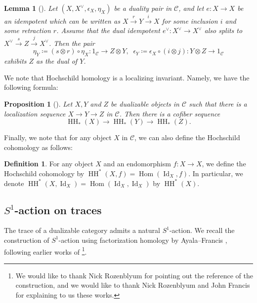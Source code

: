 \documentclass[11pt]{amsart}
\numberwithin{equation}{section}
\theoremstyle{plain}
\newtheorem{Prop}[prop]{Proposition}
\newtheorem{Lemma}[lemma]{Lemma}
\theoremstyle{definition}
\newtheorem{Def}[def]{Definition}
\theoremstyle{remark}
\newcommand{\cC} { {\mathcal{C}}}
\newcommand{\Id}{{\operatorname{Id}}}
\newcommand\HH{\operatorname{HH}}
\newcommand\Hom{\operatorname{Hom}}
\begin{document}
\begin{Lemma}[{\cite[Lemma~2.1]{Hochschild-Kuo-Shende-Zhang}}]\label{lemma: formula for dualizaing data}
Let $(X,X^\vee,\epsilon_X,\eta_X)$ be a duality pair in $\cC$, and
let $e: X \rightarrow X$ be an idempotent which can be written as $X \xrightarrow{r} Y \xrightarrow{i} X$
for some inclusion $i$ and some retraction $r$. 
Assume that the dual idempotent $e^\vee: X^\vee \rightarrow X^\vee$ also splits to $X^\vee \xrightarrow{s} Z \xrightarrow{j} X^\vee$. 
Then the pair
\[\eta_Y \coloneqq (s \otimes r) \circ \eta_X : 1_{\cC} \rightarrow Z \otimes Y, \;\; \epsilon_Y \coloneqq \epsilon_X \circ (i \otimes j) : Y \otimes Z \rightarrow 1_{\cC}\]
exhibits $Z$ as the dual of $Y$. 
\end{Lemma}

We note that Hochschild homology is a localizing invariant. Namely, we have the following formula:

\begin{Prop}[{\cite[Theorem 3.4]{Hoyois-Scherotzke-Sibilla}}]\label{prop:hochschild-fiber-seq}
Let $X, Y$ and $Z$ be dualizable objects in $\cC$ such that there is a localization sequence $X \to Y \to Z$ in $\cC$.
Then there is a cofiber sequence
\[\HH_*(X) \to \HH_*(Y) \to \HH_*(Z).\]
\end{Prop}

Finally, we note that for any object $X$ in $\cC$, we can also define the Hochschild cohomology as follows:

\begin{Def}
For any object $X$ and an endomorphism $f:X\to X$, we define the Hochschild cohomology by $\HH^*(X, f) = \Hom(\Id_X, f)$. In particular, we denote $\HH^*(X, \Id_X) = \Hom(\Id_X, \Id_X)$ by $\HH^*(X)$.
\end{Def}

\subsection{\texorpdfstring{$S^1$-action on traces}{}}
The trace of a dualizable category admits a natural $S^1$-action. We recall the construction of $S^1$-action using factorization homology by Ayala--Francis \cite{Ayala-Francis-FH-dim1}, following earlier works of \cite{Ayala-Francis-FH,AMGR-FH-enriched}\footnote{We would like to thank Nick Rozenblyum for pointing out the reference of the construction, and we would like to thank Nick Rozenblyum and John Francis for explaining to us these works.}. 
\end{document}
